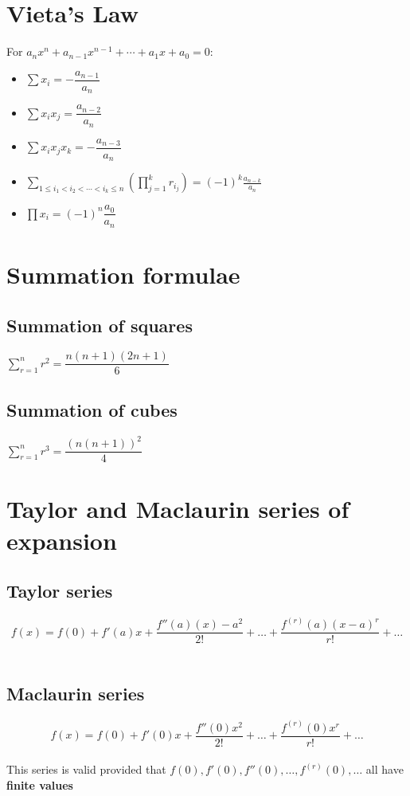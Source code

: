 \section{Vieta's Law}
For $a_{n}x^{n}+a_{n-1}x^{n-1}+\cdots +a_{1}x+a_{0}=0$:
\begin{itemize}
	\item $\sum x_i=-\dfrac{a_{n-1}}{a_n}$
	\item $\sum x_ix_j=\dfrac{a_{n-2}}{a_n}$
	\item $\sum x_ix_jx_k = -\dfrac{a_{n-3}}{a_n}$
	\item $\sum _{1\leq i_{1}<i_{2}<\cdots <i_{k}\leq n}\left(\prod _{j=1}^{k}r_{i_{j}}\right)=(-1)^{k}{\frac {a_{n-k}}{a_{n}}}$
	\item $\prod x_i=(-1)^n\dfrac{a_0}{a_n}$
\end{itemize}
\section{Summation formulae}
\subsection{Summation of squares}
$\sum_{r=1}^{n} r^2=\dfrac{n(n+1)(2n+1)}{6}$ 
\subsection{Summation of cubes}
$\sum_{r=1}^{n} r^3=\dfrac{(n(n+1))^2}{4}$
\section{Taylor and Maclaurin series of expansion}
\subsection{Taylor series}
$$f(x)=f(0)+f'(a)x+\dfrac{f''(a)(x)-a^2}{2!}+\dots+\dfrac{f^{(r)}(a)(x-a)^r}{r!}+\dots$$\\

\subsection{Maclaurin series}
$$f(x)=f(0)+f'(0)x+\dfrac{f''(0)x^2}{2!}+\dots+\dfrac{f^{(r)}(0)x^r}{r!}+\dots$$\\
This series is valid provided that $f(0), f'(0), f''(0),\dots,f^{(r)}(0),\dots$ all have \textbf{finite values}

